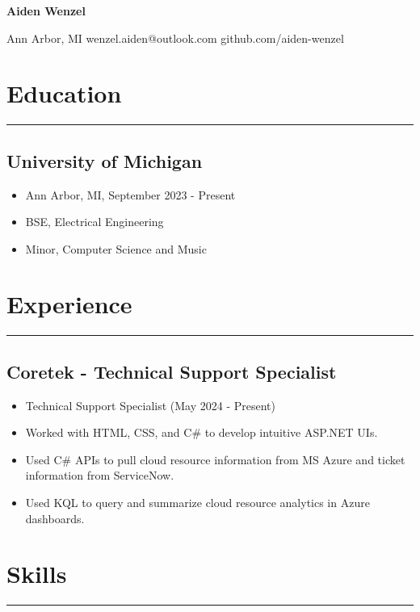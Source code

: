\documentclass[10pt, letterpaper]{article}
\begin{document}
\thispagestyle{empty}
\begin{center}
	\textbf{\huge{Aiden Wenzel}}
	\vspace{3pt}

	Ann Arbor, MI \hspace{5pt} wenzel.aiden@outlook.com \hspace{5pt} github.com/aiden-wenzel
\end{center}

\section*{Education}
\hrule
\vspace{7pt}

\subsection*{University of Michigan}
\begin{itemize}[noitemsep]
	\item Ann Arbor, MI, September 2023 - Present
	\item BSE, Electrical Engineering
	\item Minor, Computer Science and Music
\end{itemize}

\section*{Experience}
\hrule
\vspace{7pt}

\subsection*{Coretek - Technical Support Specialist}
\begin{itemize}[noitemsep]
	\item Technical Support Specialist (May 2024 - Present)
	\item Worked with HTML, CSS, and C\# to develop intuitive ASP.NET UIs.
	\item Used C\# APIs to pull cloud resource information from MS Azure and ticket information from ServiceNow.
	\item Used KQL to query and summarize cloud resource analytics in Azure dashboards.
\end{itemize}

\section*{Skills}
\hrule
\vspace{7pt}
\end{document}
